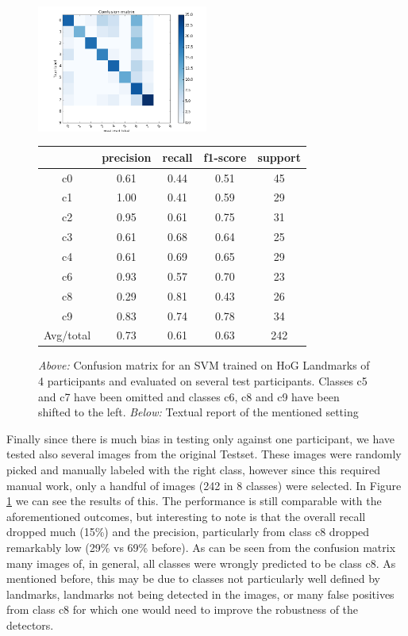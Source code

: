 \documentclass[10pt,twocolumn,letterpaper]{article}
\begin{document}
\begin{figure}[h]
	\centering
	\includegraphics[width=0.5\textwidth]{mult_HOG/4c01234689matTest}
		\begin{tabular}{c||c|c|c|c}
			& precision&recall&f1-score&support\\	\hline
			c0&0.61&0.44&0.51&45\\
			c1&1.00&0.41&0.59&29\\
			c2&0.95&0.61&0.75&31\\
			c3&0.61&0.68&0.64&25\\
			c4&0.61&0.69&0.65&29\\
			c6&0.93&0.57&0.70&23\\
			c8&0.29&0.81&0.43&26\\
			c9&0.83&0.74&0.78&34\\ \hline
			Avg/total &0.73&0.61& 0.63 &242
		\end{tabular}
	\caption{\textit{Above:} Confusion matrix for an SVM trained on HoG Landmarks of 4 participants and evaluated on several test participants. Classes c5 and c7 have been omitted and classes c6, c8 and c9 have been shifted to the left. \textit{Below:} Textual report of the mentioned setting}
	\label{Landmarks_4no5no7test}
\end{figure}

Finally since there is much bias in testing only against one participant, we have tested also several images from the original Testset. These images were randomly picked and manually labeled with the right class, however since this required manual work, only a handful of images (242 in 8 classes) were selected. In Figure \ref{Landmarks_4no5no7test} we can see the results of this. The performance is still comparable with the aforementioned outcomes, but interesting to note is that the overall recall dropped much (15\%) and the precision, particularly from class c8 dropped remarkably low (29\% vs 69\% before). As can be seen from the confusion matrix many images of, in general, all classes were wrongly predicted to be class c8. As mentioned before, this may be due to classes not particularly well defined by landmarks, landmarks not being detected in the images, or many false positives from class c8 for which one would need to improve the robustness of the detectors.
\end{document}
